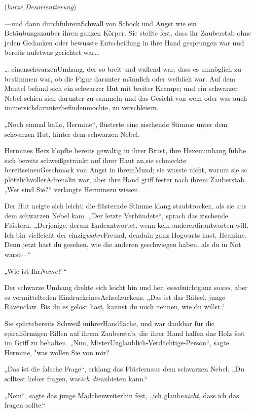 {(\emph{kurze Desorientierung})

—und dann durchfuhreinSchwall von Schock und Angst wie ein Betäubungszauber ihren ganzen Körper. Sie stellte fest, dass ihr Zauberstab ohne jeden Gedanken oder bewusste Entscheidung in ihre Hand gesprungen war und bereits aufetwas gerichtet war…

… einenschwarzenUmhang, der so breit und wallend war, dass es unmöglich zu bestimmen war, ob die Figur darunter männlich oder weiblich war. Auf dem Mantel befand sich ein schwarzer Hut mit breiter Krempe; und ein schwarzer Nebel schien sich darunter zu sammeln und das Gesicht von wem oder was auch immersichdarunterbefindenmochte, zu verschleiern.

„Noch einmal hallo, Hermine“, flüsterte eine zischende Stimme unter dem schwarzen Hut, hinter dem schwarzen Nebel.

Hermines Herz klopfte bereits gewaltig in ihrer Brust, ihre Hexenumhang fühlte sich bereits schweißgetränkt auf ihrer Haut an,sie schmeckte bereitseinenGeschmack von Angst in ihremMund; sie wusste nicht, warum sie so plötzlichvollerAdrenalin war, aber ihre Hand griff fester nach ihrem Zauberstab. „Wer sind Sie?“ verlangte Herminezu wissen.

Der Hut neigte sich leicht; die flüsternde Stimme klang staubtrocken, als sie aus dem schwarzen Nebel kam. „Der letzte Verbündete“, sprach das zischende Flüstern. „Derjenige, deram Endeantwortet, wenn kein andererdirantworten will. Ich bin vielleicht der einzig\emph{wahre}Freund, denduin ganz Hogwarts hast, Hermine. Denn jetzt hast du gesehen, wie die anderen geschwiegen haben, als du in Not warst—“

„Wie ist Ihr\emph{Name?} “

Der schwarze Umhang drehte sich leicht hin und her, es\emph{sah}nichtganz so\emph{aus}, aber es vermittelteden EindruckeinesAchselzuckens. „Das ist das Rätsel, junge Ravenclaw. Bis du es gelöst hast, kannst du mich nennen, wie du willst.“

Sie spürtebereits Schweiß inihrerHandfläche, und war dankbar für die spiralförmigen Rillen auf ihrem Zauberstab, die ihrer Hand halfen das Holz fest im Griff zu behalten. „Nun, MisterUnglaublich-Verdächtige-Person“, sagte Hermine, "was wollen Sie von mir?

„Das ist die falsche Frage“, erklang das Flüsternaus dem schwarzen Nebel. „Du solltest lieber fragen, was\emph{ich dir}anbieten kann.“

„Nein“, sagte das junge Mädchenweiterhin fest, „ich glaube\emph{nicht}, dass ich das fragen sollte.“

}
